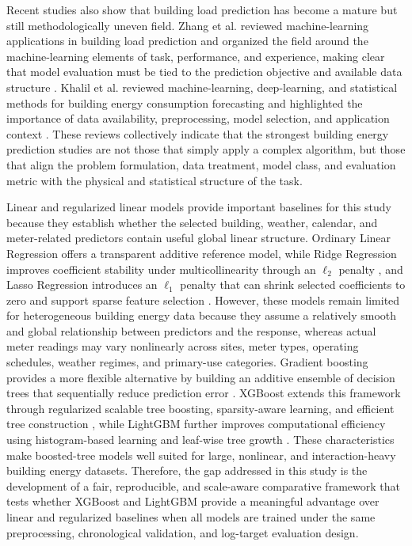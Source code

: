 \documentclass[conference]{IEEEtran}
\begin{document}
Recent studies also show that building load prediction has become a mature but still methodologically uneven field. Zhang et al. reviewed machine-learning applications in building load prediction and organized the field around the machine-learning elements of task, performance, and experience, making clear that model evaluation must be tied to the prediction objective and available data structure \cite{zhang2021review}. Khalil et al. reviewed machine-learning, deep-learning, and statistical methods for building energy consumption forecasting and highlighted the importance of data availability, preprocessing, model selection, and application context \cite{khalil2022review}. These reviews collectively indicate that the strongest building energy prediction studies are not those that simply apply a complex algorithm, but those that align the problem formulation, data treatment, model class, and evaluation metric with the physical and statistical structure of the task.

Linear and regularized linear models provide important baselines for this study because they establish whether the selected building, weather, calendar, and meter-related predictors contain useful global linear structure. Ordinary Linear Regression offers a transparent additive reference model, while Ridge Regression improves coefficient stability under multicollinearity through an $\ell_2$ penalty \cite{hoerl1970ridge}, and Lasso Regression introduces an $\ell_1$ penalty that can shrink selected coefficients to zero and support sparse feature selection \cite{tibshirani1996lasso}. However, these models remain limited for heterogeneous building energy data because they assume a relatively smooth and global relationship between predictors and the response, whereas actual meter readings may vary nonlinearly across sites, meter types, operating schedules, weather regimes, and primary-use categories. Gradient boosting provides a more flexible alternative by building an additive ensemble of decision trees that sequentially reduce prediction error \cite{friedman2001greedy}. XGBoost extends this framework through regularized scalable tree boosting, sparsity-aware learning, and efficient tree construction \cite{chen2016xgboost}, while LightGBM further improves computational efficiency using histogram-based learning and leaf-wise tree growth \cite{ke2017lightgbm}. These characteristics make boosted-tree models well suited for large, nonlinear, and interaction-heavy building energy datasets. Therefore, the gap addressed in this study is the development of a fair, reproducible, and scale-aware comparative framework that tests whether XGBoost and LightGBM provide a meaningful advantage over linear and regularized baselines when all models are trained under the same preprocessing, chronological validation, and log-target evaluation design. 
\end{document}
